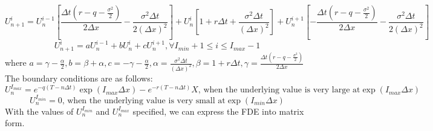 $$ U_{n+1}^{i} = U_{n}^{i-1}[\frac{\Delta t(r - q - \frac{\sigma^{2}}{2})}{2\Delta x} -\frac{\sigma^{2}\Delta t}{2(\Delta x)^{2}}] + U_{n}^{i} [1+ r \Delta t + \frac{\sigma ^ {2} \Delta t}{(\Delta x)^{2}}] + U_{n}^{i+1}[- \frac{\Delta t(r - q - \frac{\sigma^{2}}{2})}{2\Delta x} -\frac{\sigma^{2}\Delta t}{2(\Delta x)^{2}} ]$$
$$ U_{n+1}^{i} = aU_{n}^{i-1}+ bU_{n}^{i} + cU_{n}^{i+1} , \forall I_{min}+1 \le i \le I_{max}-1$$
\hspace*{100pt} where $a = \gamma-\frac{\alpha}{2}, b = \beta + \alpha, c = -\gamma-\frac{\alpha}{2}, \alpha = \frac{\sigma^{2}\Delta t}{(\Delta x)^{2}}, \beta = 1+ r \Delta t, \gamma = \frac{\Delta t(r - q - \frac{\sigma^{2}}{2})}{2\Delta x}$\\[3mm]
The boundary conditions are as follows:\\
$$U_{n}^{I_{max}} = e^{-q(T-n \Delta t)}\exp(I_{max}\Delta x) - e^{-r(T-n \Delta t)}X \text{, when the underlying value is very large at} \exp(I_{max}\Delta x)$$
$$U_{n}^{I_{min}} = 0\text{, when the underlying value is very small at} \exp(I_{min}\Delta x)$$
\newpage
With the values of $U_{n}^{I_{min}}$ and $U_{n}^{I_{max}}$ specified, we can express the FDE into matrix form.
